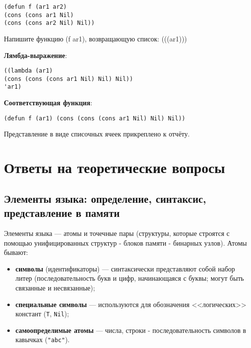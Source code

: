 \begin{lstlisting}
(defun f (ar1 ar2) 
(cons (cons ar1 Nil) 
(cons (cons ar2 Nil) Nil))
\end{lstlisting}


\vspace{10mm}

\begin{flushleft}
	Напишите функцию (f ar1), возвращающую список: (((ar1)))
	
	
	\textbf{Лямбда-выражение}:
\end{flushleft}

\begin{lstlisting}
((lambda (ar1) 
(cons (cons (cons ar1 Nil) Nil) Nil)) 
'ar1)
\end{lstlisting}

\begin{flushleft}
	\textbf{Соответствующая функция}:
\end{flushleft}

\begin{lstlisting}
(defun f (ar1) (cons (cons (cons ar1 Nil) Nil) Nil))
\end{lstlisting}

Представление в виде списочных ячеек прикреплено к отчёту.

\chapter*{Ответы на теоретические вопросы} 

\section*{Элементы языка: определение, синтаксис, представление в памяти}
Элементы языка --- атомы и точечные пары (структуры, которые строятся с помощью унифицированных структур - блоков памяти - бинарных узлов). Атомы бывают:
\begin{itemize}
	\item \textbf{символы} (идентификаторы) --- синтаксически представляют собой набор литер (последовательность букв и цифр, начинающаяся с буквы; могут быть связанные и несвязанные);
	\item \textbf{специальные символы} --- используются для обозначения <<логических>> констант (\texttt{T}, \texttt{Nil});
	\item \textbf{самоопределимые атомы} --- числа, строки - последовательность символов в кавычках (\texttt{"abc"}).
\end{itemize}

